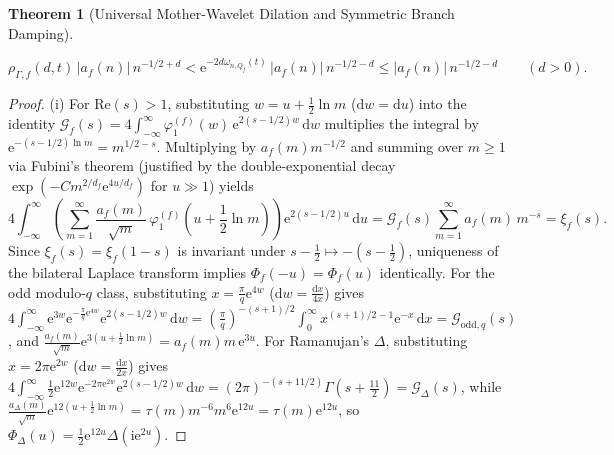 \documentclass[11pt,reqno]{amsart}
\newtheorem{theorem}{Theorem}[section]
\theoremstyle{definition}
\theoremstyle{remark}
\numberwithin{equation}{section}
\newcommand{\dd}{\mathrm{d}}
\newcommand{\ee}{\mathrm{e}}
\newcommand{\ii}{\mathrm{i}}
\newcommand{\Rea}{\mathrm{Re}}
\begin{document}
\begin{theorem}[Universal Mother-Wavelet Dilation and Symmetric Branch Damping]
\begin{enumerate}[label=\textup{(\roman*)},leftmargin=2.2em]
\begin{equation}\label{eq:branch_damping_ineq}
\rho_{\Gamma,f}(d,t)\,\bigl|a_f(n)\bigr|\,n^{-1/2+d} < \ee^{-2d\omega_{n,Q_f}(t)}\,\bigl|a_f(n)\bigr|\,n^{-1/2-d} \le \bigl|a_f(n)\bigr|\,n^{-1/2-d} \qquad (d > 0).
\end{equation}
\end{enumerate}
\end{theorem}

\begin{proof}
(i) For $\Rea(s) > 1$, substituting $w = u + \frac{1}{2}\ln m$ ($\dd w = \dd u$) into the identity $\mathcal{G}_f(s) = 4\int_{-\infty}^\infty \varphi_1^{(f)}(w)\,\ee^{2(s-1/2)w}\,\dd w$ multiplies the integral by $\ee^{-(s-1/2)\ln m} = m^{1/2-s}$. Multiplying by $a_f(m)m^{-1/2}$ and summing over $m \ge 1$ via Fubini's theorem (justified by the double-exponential decay $\exp(-C m^{2/d_f}\ee^{4u/d_f})$ for $u \gg 1$) yields
\[
4\int_{-\infty}^{\infty} \left(\sum_{m=1}^{\infty} \frac{a_f(m)}{\sqrt{m}}\,\varphi_1^{(f)}\!\left(u + \frac{1}{2}\ln m\right)\right)\ee^{2(s-1/2)u}\,\dd u = \mathcal{G}_f(s)\sum_{m=1}^{\infty} a_f(m)\,m^{-s} = \xi_f(s).
\]
Since $\xi_f(s) = \xi_f(1-s)$ is invariant under $s - \frac{1}{2} \mapsto -(s - \frac{1}{2})$, uniqueness of the bilateral Laplace transform implies $\Phi_f(-u) = \Phi_f(u)$ identically. For the odd modulo-$q$ class, substituting $x = \frac{\pi}{q}\ee^{4w}$ ($\dd w = \frac{\dd x}{4x}$) gives $4\int_{-\infty}^\infty \ee^{3w}\ee^{-\frac{\pi}{q}\ee^{4w}}\ee^{2(s-1/2)w}\,\dd w = (\frac{\pi}{q})^{-(s+1)/2}\int_0^\infty x^{(s+1)/2-1}\ee^{-x}\,\dd x = \mathcal{G}_{\mathrm{odd},q}(s)$, and $\frac{a_f(m)}{\sqrt{m}}\ee^{3(u+\frac{1}{2}\ln m)} = a_f(m)m\,\ee^{3u}$. For Ramanujan's $\Delta$, substituting $x = 2\pi\ee^{2w}$ ($\dd w = \frac{\dd x}{2x}$) gives $4\int_{-\infty}^\infty \frac{1}{2}\ee^{12w}\ee^{-2\pi\ee^{2w}}\ee^{2(s-1/2)w}\,\dd w = (2\pi)^{-(s+11/2)}\Gamma(s+\frac{11}{2}) = \mathcal{G}_\Delta(s)$, while $\frac{a_\Delta(m)}{\sqrt{m}}\ee^{12(u+\frac{1}{2}\ln m)} = \tau(m)m^{-6}m^6\ee^{12u} = \tau(m)\ee^{12u}$, so $\Phi_\Delta(u) = \frac{1}{2}\ee^{12u}\Delta(\ii\ee^{2u})$.


\end{proof}
\end{document}
